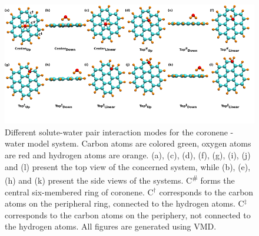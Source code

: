 \begin{figure}
    \centering
    \includegraphics{Chapter1/Figures/water.png}
    \caption[Different solute-water pair interaction modes for the coronene - water model system]{Different solute-water pair interaction modes for the coronene - water model system. Carbon atoms are colored green, oxygen atoms are red and hydrogen atoms are orange. (a), (c), (d), (f), (g), (i), (j) and (l) present the top view of the concerned system, while (b), (e), (h) and (k) present the side views of the systems. C\textsuperscript{\#} forms the central six-membered ring of coronene. C$^\dagger$ corresponds to the carbon atoms on the peripheral ring, connected to the hydrogen atoms. C$^\ddagger$ corresponds to the carbon atoms on the periphery, not connected to the hydrogen atoms. All figures are generated using VMD.}
\end{figure}

